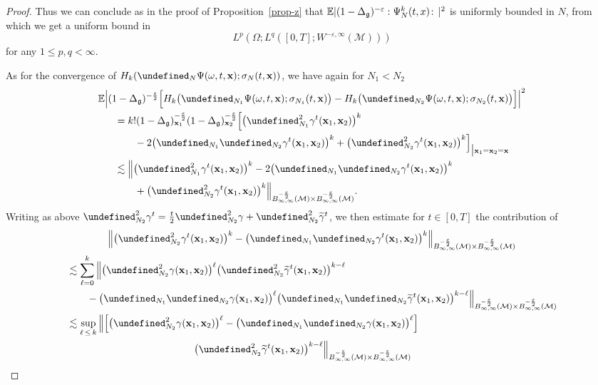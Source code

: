\documentclass[10pt]{amsart}
\theoremstyle{definition}\newtheorem{defi}[theo]{Definition}\newtheorem{rema}[theo]{Remark}\newtheorem{exam}[theo]{Example}\newtheorem{exem}[theo]{Example}\newtheorem{nota}[theo]{Notation}
\newcommand{\E}{\mathbb{E}}
\let\P= \undefined
\newcommand{\P}{\mathbf{P}}
\newcommand{\x}{\mathbf{x}}
\newcommand{\M}{\mathcal{M}}
\newcommand{\g}{\mathfrak{g}}
\newcommand{\Dlg}{\Delta_{\g}}
\newcommand{\eps}{\varepsilon}
\newcommand{\s}{\sigma}
\newcommand{\wt}{\widetilde}
\renewcommand{\o}{\omega}
\renewcommand{\O}{\Omega}
\newcommand{\les}{\lesssim}
\begin{document}
\begin{proof}
Thus we can conclude as in the proof of Proposition~\ref{prop-z} that $ \E|(1-\Dlg)^{-\eps}:\linebreak\Psi_N^k(t,x)\!:\,|^2$ is uniformly bounded in $N$, from which we get a uniform bound in 
\[
L^p\left(\O;L^q([0,T];W^{-\eps,\infty}(\M))\right)
\]
for any $1\leq p,q<\infty$.

As for the convergence of $H_k(\P_N\Psi(\o,t,\x);\s_N(t,\x))$, we have again for $N_1< N_2$
\begin{multline*}
\E\Big|(1-\Dlg)^{-\frac\eps2}\Big[H_k\big(\P_{N_1}\Psi(\o,t,\x);\s_{N_1}(t,\x)\big)-H_k\big(\P_{N_2}\Psi(\o,t,\x);\s_{N_2}(t,\x)\big)\Big]\Big|^2\\
\begin{aligned}
&=k!(1-\Dlg)_{\x_1}^{-\frac\eps2}(1-\Dlg)_{\x_2}^{-\frac\eps2}\Big[\big(\P_{N_1}^2\gamma^t(\x_1,\x_2)\big)^k\\
&\qquad-2\big(\P_{N_1}\P_{N_2}\gamma^t(\x_1,\x_2)\big)^k+\big(\P_{N_2}^2\gamma^t(\x_1,\x_2)\big)^k\Big]_{\big|\x_1=\x_2=\x}\\
&\les \Big\|\big(\P_{N_1}^2\gamma^t(\x_1,\x_2)\big)^k-2\big(\P_{N_1}\P_{N_2}\gamma^t(\x_1,\x_2)\big)^k\\
&\qquad+\big(\P_{N_2}^2\gamma^t(\x_1,\x_2)\big)^k\Big\|_{B^{-\frac{\eps}2}_{\infty,\infty}(\M)\times B^{-\frac{\eps}2}_{\infty,\infty}(\M)}.
\end{aligned}
\end{multline*}
Writing as above $\P_{N_2}^2\gamma^t = \frac{t}2\P_{N_2}^2\gamma + \P_{N_2}^2\wt\gamma^t$, we then estimate for $t\in [0,T]$ the contribution of
\begin{multline*}
\Big\|\big(\P_{N_2}^2\gamma^t(\x_1,\x_2)\big)^k-\big(\P_{N_1}\P_{N_2}\gamma^t(\x_1,\x_2)\big)^k\Big\|_{B^{-\frac{\eps}2}_{\infty,\infty}(\M)\times B^{-\frac{\eps}2}_{\infty,\infty}(\M)}\\
\begin{aligned}
&\les \sum_{\ell=0}^k \Big\|\big(\P_{N_2}^2\gamma(\x_1,\x_2)\big)^{\ell}\big(\P_{N_2}^2\wt\gamma^t(\x_1,\x_2)\big)^{k-\ell}\\
&\qquad-\big(\P_{N_1}\P_{N_2}\gamma(\x_1,\x_2)\big)^{\ell}\big(\P_{N_1}\P_{N_2}\wt\gamma^t(\x_1,\x_2)\big)^{k-\ell}\Big\|_{B^{-\frac{\eps}2}_{\infty,\infty}(\M)\times B^{-\frac{\eps}2}_{\infty,\infty}(\M)}\\
&\les \sup_{\ell\,\le\,k} \Big\|\Big[\big(\P_{N_2}^2\gamma(\x_1,\x_2)\big)^{\ell}-\big(\P_{N_1}\P_{N_2}\gamma(\x_1,\x_2)\big)^{\ell}\Big]\\
&\mkern230mu\big(\P_{N_2}^2\wt\gamma^t(\x_1,\x_2)\big)^{k-\ell}\Big\|_{B^{-\frac{\eps}2}_{\infty,\infty}(\M)\times B^{-\frac{\eps}2}_{\infty,\infty}(\M)}\\

\end{aligned}
\end{multline*}
\end{proof}
\end{document}
